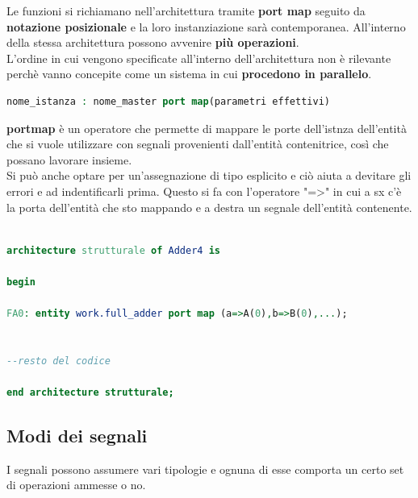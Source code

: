 \documentclass[a4paper]{book}
\begin{document}
Le funzioni si richiamano nell'architettura tramite \textbf{port map} seguito da \textbf{notazione posizionale} e la loro instanziazione sarà contemporanea.
All'interno della stessa architettura possono avvenire \textbf{più operazioni}.\\
L'ordine in cui vengono specificate all'interno dell'architettura non è rilevante perchè vanno concepite come un sistema in cui \textbf{procedono in parallelo}.\\
\begin{lstlisting}[language=VHDL]
nome_istanza : nome_master port map(parametri effettivi)
\end{lstlisting}\vspace{\baselineskip}
\textbf{portmap} è un operatore che permette di mappare le porte dell'istnza dell'entità che si vuole utilizzare con segnali provenienti dall'entità contenitrice, così che possano lavorare insieme.\vspace{\baselineskip}\\
Si può anche optare per un'assegnazione di tipo esplicito e ciò aiuta a devitare gli errori e ad indentificarli prima.
Questo si fa con l'operatore "=>" in cui a sx c'è la porta dell'entità che sto mappando e a destra un segnale dell'entità contenente.

\begin{lstlisting}[language=VHDL]

architecture strutturale of Adder4 is

begin

FA0: entity work.full_adder port map (a=>A(0),b=>B(0),...);


--resto del codice

end architecture strutturale;


\end{lstlisting}


\newpage
\subsection{Modi dei segnali}

I segnali possono assumere vari tipologie e ognuna di esse comporta un certo set di operazioni ammesse o no.
\end{document}
